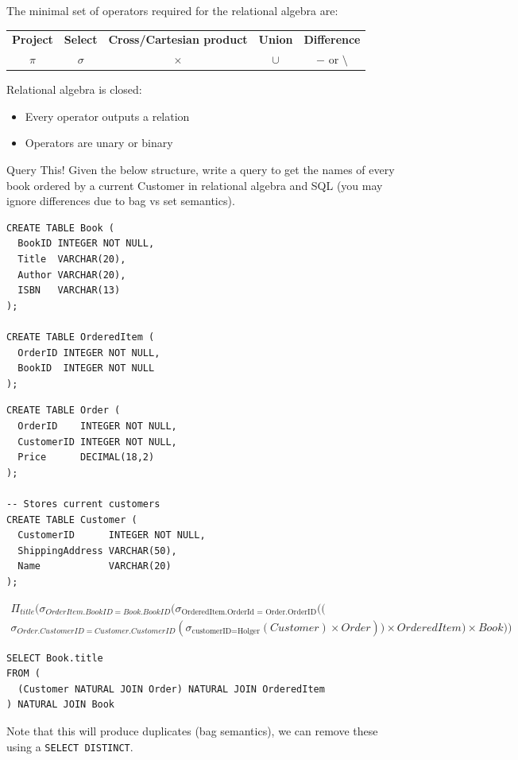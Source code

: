 The minimal set of operators required for the relational algebra are:
\begin{center}
  \begin{tabular}{c c c c c}
    \textbf{Project} & \textbf{Select} & \textbf{Cross/Cartesian product} & \textbf{Union} & \textbf{Difference} \\
    $\pi$            & $\sigma$        & $\times$                         & $\cup$         & $-$ or $\setminus$  \\
  \end{tabular}
\end{center}
Relational algebra is closed:
\begin{itemize}
  \item Every operator outputs a relation
  \item Operators are unary or binary
\end{itemize}

\begin{examplebox}{Query This!}
  Given the below structure, write a query to get the names of every book ordered by a current Customer in relational algebra and SQL (you may ignore differences due to bag vs set semantics).
  \begin{center}
    \begin{minipage}{.49\textwidth}
      \begin{verbatim}
CREATE TABLE Book (
  BookID INTEGER NOT NULL,
  Title  VARCHAR(20),
  Author VARCHAR(20),
  ISBN   VARCHAR(13)
);

CREATE TABLE OrderedItem (
  OrderID INTEGER NOT NULL,
  BookID  INTEGER NOT NULL
);

      \end{verbatim}
    \end{minipage} \hfill \begin{minipage}{.49\textwidth}
      \begin{verbatim}
CREATE TABLE Order (
  OrderID    INTEGER NOT NULL,
  CustomerID INTEGER NOT NULL,
  Price      DECIMAL(18,2)
);

-- Stores current customers
CREATE TABLE Customer (
  CustomerID      INTEGER NOT NULL,
  ShippingAddress VARCHAR(50),
  Name            VARCHAR(20) 
);
      \end{verbatim}
    \end{minipage}
  \end{center}
  \tcblower
  \begin{multline*}
    \Pi_{title}(\sigma_{OrderItem.BookID = Book.BookID}(\sigma_{\text{OrderedItem.OrderId = Order.OrderID}}(( \\ \sigma_{Order.CustomerID = Customer.CustomerID}(\sigma_{\text{customerID=Holger}}(Customer) \times Order)) \times OrderedItem) \times Book))
  \end{multline*}
  \begin{verbatim}
SELECT Book.title
FROM (
  (Customer NATURAL JOIN Order) NATURAL JOIN OrderedItem
) NATURAL JOIN Book
  \end{verbatim}
  Note that this will produce duplicates (bag semantics), we can remove these using a \texttt{SELECT DISTINCT}.
\end{examplebox}

